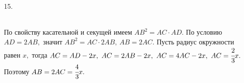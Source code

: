 15. \begin{figure}[ht!]
\end{figure}\\
По свойству касательной и секущей имеем $AB^2=AC\cdot AD.$ По условию $AD=2AB,$ значит $AB^2=AC\cdot2AB,\ AB=2AC.$ Пусть радиус окружности равен $x,$ тогда $AC=AD-2x,\ AC=2AB-2x,\ AC=4AC-2x,\ AC=\cfrac{2}{3}x.$ Поэтому $AB=2AC=\cfrac{4}{3}x.$\\
